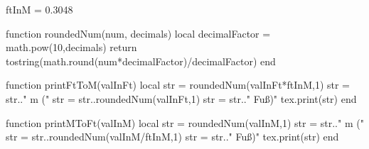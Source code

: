 \begin{luacode}
	ftInM = 0.3048
	
	function roundedNum(num, decimals)
		local decimalFactor = math.pow(10,decimals)
		return tostring(math.round(num*decimalFactor)/decimalFactor)
	end
	
	function printFtToM(valInFt)
		local str = roundedNum(valInFt*ftInM,1)
		str = str.." m ("
		str = str..roundedNum(valInFt,1)
		str = str.." Fuß)"
		tex.print(str)
	end
	
	function printMToFt(valInM)
		local str = roundedNum(valInM,1)
		str = str.." m ("
		str = str..roundedNum(valInM/ftInM,1)
		str = str.." Fuß)"
		tex.print(str)
	end
\end{luacode}

\newcommand{\ft}[1]{
	\directlua{printFtToM(#1)}
}

\newcommand{\metre}[1]{
	\directlua{printMToFt(#1)}
}
